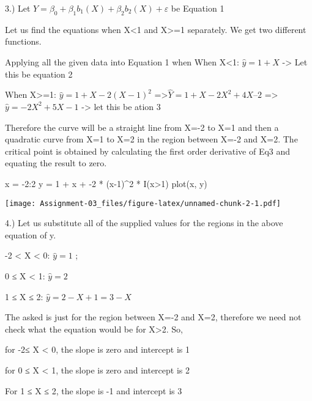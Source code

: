 \documentclass[
]{article}
\newenvironment{Shaded}{\begin{snugshade}}{\end{snugshade}}
\newcommand{\DecValTok}[1]{\textcolor[rgb]{0.00,0.00,0.81}{#1}}
\newcommand{\FunctionTok}[1]{\textcolor[rgb]{0.00,0.00,0.00}{#1}}
\newcommand{\NormalTok}[1]{#1}
\newcommand{\OtherTok}[1]{\textcolor[rgb]{0.56,0.35,0.01}{#1}}
\newcommand{\SpecialCharTok}[1]{\textcolor[rgb]{0.00,0.00,0.00}{#1}}
\begin{document}
3.) Let \(Y =β_0 +β_1b_1(X)+β_2b_2(X)+ε\) be Equation 1

Let us find the equations when X\textless1 and X\textgreater=1
separately. We get two different functions.

Applying all the given data into Equation 1 when When X\textless1:
\(\hat{y} = 1+X\) -\textgreater{} Let this be equation 2

When X\textgreater=1: \(\hat{y}= 1 + X - 2(X-1)^2\)
=\textgreater{}\(\hat{Y} = 1+ X- 2X^2 + 4X – 2\)
=\textgreater{}\(\hat{y} = -2X^2+5X-1\) -\textgreater{} let this be
ation 3

Therefore the curve will be a straight line from X=-2 to X=1 and then a
quadratic curve from X=1 to X=2 in the region between X=-2 and X=2. The
critical point is obtained by calculating the first order derivative of
Eq3 and equating the result to zero.

\begin{Shaded}
\begin{Highlighting}[]
\NormalTok{x }\OtherTok{=} \SpecialCharTok{{-}}\DecValTok{2}\SpecialCharTok{:}\DecValTok{2}
\NormalTok{y }\OtherTok{=} \DecValTok{1} \SpecialCharTok{+}\NormalTok{ x }\SpecialCharTok{+} \SpecialCharTok{{-}}\DecValTok{2} \SpecialCharTok{*}\NormalTok{ (x}\DecValTok{{-}1}\NormalTok{)}\SpecialCharTok{\^{}}\DecValTok{2} \SpecialCharTok{*} \FunctionTok{I}\NormalTok{(x}\SpecialCharTok{\textgreater{}}\DecValTok{1}\NormalTok{)}
\FunctionTok{plot}\NormalTok{(x, y)}
\end{Highlighting}
\end{Shaded}

\texttt{[image: Assignment-03\_files/figure-latex/unnamed-chunk-2-1.pdf]}

4.) Let us substitute all of the supplied values for the regions in the
above equation of y.

-2 \textless{} X \textless{} 0: \(\hat{y}= 1\) ;

0 ≤ X \textless{} 1: \(\hat{y} = 2\)

1 ≤ X ≤ 2: \(\hat{y} = 2-X+1 = 3-X\)

The asked is just for the region between X=-2 and X=2, therefore we need
not check what the equation would be for X\textgreater2. So,

for -2≤ X \textless{} 0, the slope is zero and intercept is 1

for 0 ≤ X \textless{} 1, the slope is zero and intercept is 2

For 1 ≤ X ≤ 2, the slope is -1 and intercept is 3
\end{document}
